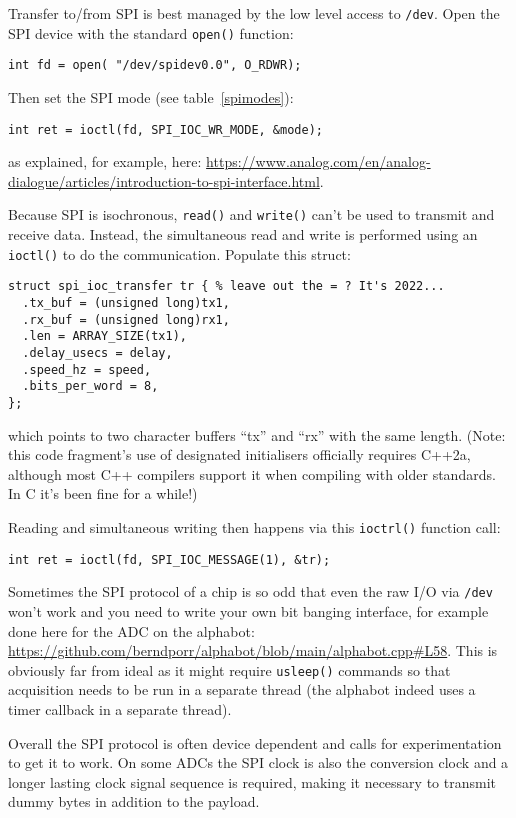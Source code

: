 \documentclass[12pt]{report}
\begin{document}
Transfer to/from SPI is best managed by the low level access to \texttt{/dev}.
Open the SPI device with the standard \texttt{open()} function:
\begin{verbatim}
int fd = open( "/dev/spidev0.0", O_RDWR);
\end{verbatim}

Then set the SPI mode (see table~\ref{spimodes}):
\begin{verbatim}
int ret = ioctl(fd, SPI_IOC_WR_MODE, &mode);
\end{verbatim}
as explained, for example, here:
\url{https://www.analog.com/en/analog-dialogue/articles/introduction-to-spi-interface.html}.

Because SPI is isochronous, \texttt{read()} and \texttt{write()}
can't be used to transmit and receive data. Instead, the simultaneous
read and write is performed using an \texttt{ioctl()} to do the communication.
Populate this struct:
\begin{verbatim}
struct spi_ioc_transfer tr { % leave out the = ? It's 2022...
  .tx_buf = (unsigned long)tx1,
  .rx_buf = (unsigned long)rx1,
  .len = ARRAY_SIZE(tx1),
  .delay_usecs = delay,
  .speed_hz = speed,
  .bits_per_word = 8,
};
\end{verbatim}
which points to two character buffers ``tx'' and ``rx'' with the
same length. (Note: this code fragment's use of designated initialisers
officially requires C++2a, although most C++ compilers support it
when compiling with older standards. In C it's been fine for a while!)

Reading and simultaneous writing then happens via this \texttt{ioctrl()}
function call:
\begin{verbatim}
int ret = ioctl(fd, SPI_IOC_MESSAGE(1), &tr);
\end{verbatim}

Sometimes the SPI protocol of a chip is so odd that even the raw
I/O via \texttt{/dev} won't work and you need to write your own bit banging
interface, for example done here for the ADC on the alphabot:
\url{https://github.com/berndporr/alphabot/blob/main/alphabot.cpp#L58}.
This is obviously far from ideal as it might require \texttt{usleep()} commands
so that acquisition needs to be run in a separate thread (the alphabot indeed
uses a timer callback in a separate thread).

Overall the SPI protocol is often device dependent and calls
for experimentation to get it to work. On some ADCs the SPI clock is also
the conversion clock and a longer lasting clock signal sequence is required,
making it necessary to transmit dummy bytes in addition to the payload.
\end{document}
